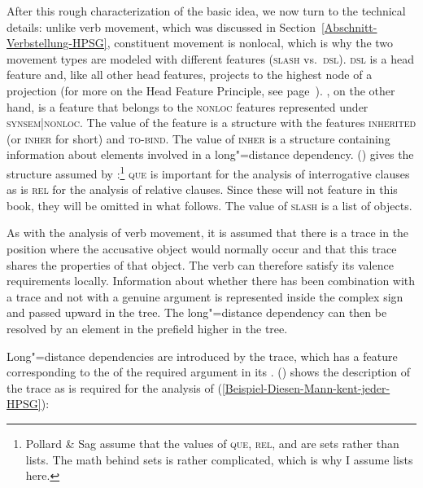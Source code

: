After this rough characterization of the basic idea, we now turn to the technical details: unlike verb
movement, which was discussed in Section~\ref{Abschnitt-Verbstellung-HPSG}, constituent movement is
nonlocal, which is why the two movement types are modeled with different features (\textsc{slash} vs.\ \textsc{dsl}).
\textsc{dsl} is a head feature and, like all other head features, projects to the highest node of a projection (for more on the Head Feature Principle,
see page~\pageref{prinzip-hfp}). \slasch, on the other hand, is a feature that belongs to the \textsc{nonloc} features represented under \textsc{synsem|nonloc}. The value of the \nonloc feature is a structure with the features \textsc{inherited} (or \textsc{inher} for short) and 
\textsc{to-bind}. The value of \textsc{inher} is a structure containing information about elements involved in a long"=distance dependency.
() gives the structure assumed by \citet[]{ps2}:\footnote{
  Pollard \& Sag assume that the values of \textsc{que}, \textsc{rel}, and \slasch are sets rather
  than lists. The math behind sets is rather complicated, which is why I assume lists here.
}
\ea
{}
\z
\textsc{que} is important for the analysis of interrogative clauses as is \textsc{rel} for the analysis of relative
clauses. Since these will not feature in this book, they will be omitted in what follows. The value of \textsc{slash}
is a list of  objects.

As with the analysis of verb movement, it is assumed that there is a
trace in the position where the accusative object would normally occur and that this trace shares the properties of that object. The verb can therefore satisfy its valence requirements locally. Information about whether
there has been combination with a trace and not with a genuine argument is represented inside the complex sign and passed upward in the tree.
The long"=distance dependency can then be resolved by an element in the prefield higher in the tree.

Long"=distance dependencies are introduced by the trace, which has a feature corresponding to the \localv of the required argument in its \slashl.
() shows the description of the trace as is required for the analysis of (\ref{Beispiel-Diesen-Mann-kent-jeder-HPSG}):

